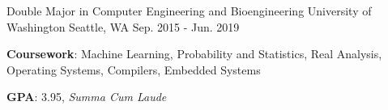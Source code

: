 \begin{cventries}
  \cventry
    {Double Major in Computer Engineering and Bioengineering}
    {University of Washington}
    {Seattle, WA}
    {Sep. 2015 - Jun. 2019}
    {
      \begin{cvitems}
	\item {\textbf{Coursework}: Machine Learning, Probability and Statistics, Real Analysis, Operating Systems, Compilers, Embedded Systems}
	\item {\textbf{GPA}: 3.95, \textit{Summa Cum Laude}}
      \end{cvitems}
    }
    \vspace{-1.0em}
\end{cventries}

